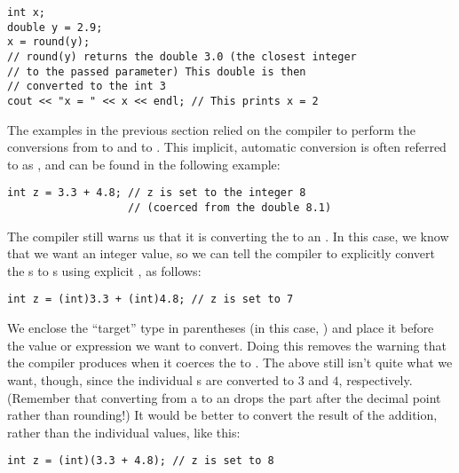 \noindent\begin{minipage}{\linewidth}\begin{lstlisting}
int x;
double y = 2.9;
x = round(y); 
// round(y) returns the double 3.0 (the closest integer 
// to the passed parameter) This double is then 
// converted to the int 3
cout << "x = " << x << endl; // This prints x = 2
\end{lstlisting}\end{minipage}


The examples in the previous section relied on the compiler to perform the conversions from  to  and  to . 
This implicit, automatic conversion is often referred to as , and can be found in the following example:

\noindent\begin{minipage}{\linewidth}\begin{lstlisting}
int z = 3.3 + 4.8; // z is set to the integer 8 
                   // (coerced from the double 8.1)
\end{lstlisting}\end{minipage}

The compiler still warns us that it is converting the  to an . 
In this case, we know that we want an integer value, so we can tell the compiler to explicitly convert the s to s using explicit , as follows:

\noindent\begin{minipage}{\linewidth}\begin{lstlisting}
int z = (int)3.3 + (int)4.8; // z is set to 7
\end{lstlisting}\end{minipage}

We enclose the ``target'' type in parentheses (in this case, ) and place it before the value or expression we want to convert. 
Doing this removes the warning that the compiler produces when it coerces the  to . 
The above still isn't quite what we want, though, since the individual s are converted to $3$ and $4$, respectively. 
(Remember that converting from a  to an  drops the part after the decimal point rather than rounding!) 
It would be better to convert the result of the addition, rather than the individual values, like this: \nopagebreak[4]

\noindent\begin{minipage}{\linewidth}\begin{lstlisting}
int z = (int)(3.3 + 4.8); // z is set to 8
\end{lstlisting}\end{minipage}

